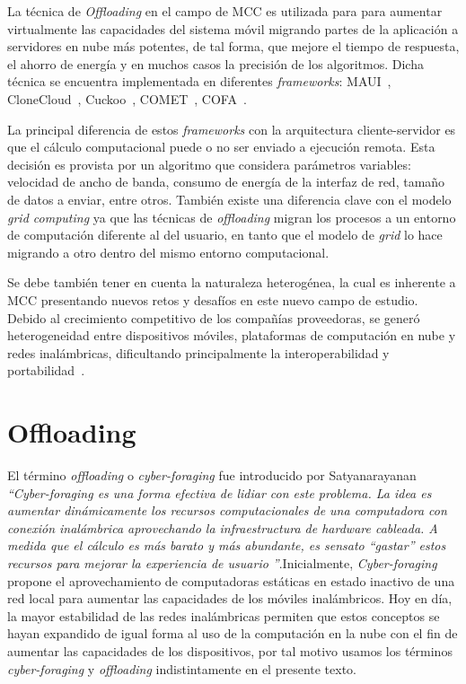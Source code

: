 La técnica de \emph{Offloading} en el campo de MCC es utilizada para para aumentar virtualmente las capacidades del sistema móvil migrando 
partes de la aplicación a servidores en nube más potentes, de tal forma,  que mejore el tiempo de respuesta, el ahorro de energía y en muchos casos la precisión de los algoritmos. Dicha técnica se encuentra implementada en diferentes {\em frameworks}: MAUI~\cite{Cuervo:2010:MMS:1814433.1814441}, CloneCloud~\cite{chun2011clonecloud}, Cuckoo~\cite{kemp2012cuckoo}, 
COMET~\cite{gordon2012comet}, COFA~\cite{shivarudrappa2011cofa}.

La principal diferencia de estos {\em frameworks} con la arquitectura cliente-servidor es que el cálculo computacional puede o no ser enviado a ejecución remota. Esta decisión es provista por un algoritmo que considera parámetros variables: velocidad de ancho de banda, consumo de energía 
de la interfaz de red, tamaño de datos a enviar, entre otros. También existe una diferencia clave con el modelo \emph{grid computing} ya que las técnicas de \emph{offloading} migran los procesos
a un entorno de computación diferente al del usuario, en tanto que el modelo de \emph{grid} lo hace migrando a otro dentro del mismo entorno computacional. 

Se debe también tener en cuenta la naturaleza heterogénea, la cual es inherente a MCC presentando nuevos retos y desafíos en este nuevo campo de estudio. Debido al crecimiento competitivo de los compañías proveedoras, se generó heterogeneidad entre dispositivos móviles, plataformas de computación en nube y redes inalámbricas, dificultando principalmente la interoperabilidad y portabilidad~\cite{sanaei2014heterogeneity}.

\section{Offloading}
\label{offloading}
El término \emph{offloading} o \emph{cyber-foraging} fue introducido por Satyanarayanan \cite{943998} \emph {``Cyber-foraging es una forma efectiva de lidiar 
con este problema. La idea es aumentar dinámicamente los recursos computacionales de una computadora con conexión inalámbrica aprovechando 
la infraestructura de hardware cableada. A medida que el cálculo es más barato y más abundante, es sensato ``gastar'' estos recursos 
para mejorar la experiencia de usuario ''}.Inicialmente, \emph{Cyber-foraging} propone el aprovechamiento de computadoras estáticas 
en estado inactivo de una red local para aumentar las capacidades de los móviles inalámbricos. Hoy en día, la mayor estabilidad de las redes 
inalámbricas 
permiten que estos conceptos se hayan expandido de igual forma al uso de la computación en la nube con el fin de aumentar las capacidades 
de los dispositivos, por tal motivo usamos los términos \emph{cyber-foraging} y \emph{offloading} indistintamente en el presente texto.


